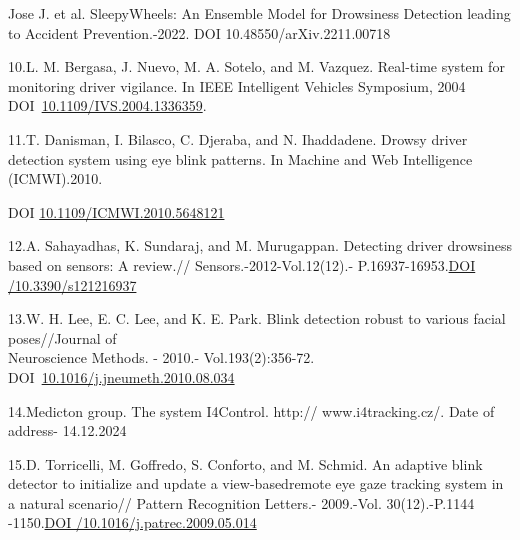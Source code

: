 \begin{references}
Jose J. et al. SleepyWheels: An Ensemble Model for Drowsiness Detection
leading to Accident Prevention.-2022. DOI 10.48550/arXiv.2211.00718

10.L. M. Bergasa, J. Nuevo, M. A. Sotelo, and M. Vazquez. Real-time
system for monitoring driver vigilance. In IEEE Intelligent Vehicles
Symposium, 2004
DOI~\href{https://doi.org/10.1109/IVS.2004.1336359}{10.1109/IVS.2004.1336359}.

11.T. Danisman, I. Bilasco, C. Djeraba, and N. Ihaddadene. Drowsy driver
detection system using eye blink patterns. In Machine and Web
Intelligence (ICMWI).2010.

DOI
\href{http://dx.doi.org/10.1109/ICMWI.2010.5648121}{10.1109/ICMWI.2010.5648121}

12.A. Sahayadhas, K. Sundaraj, and M. Murugappan. Detecting driver
drowsiness based on sensors: A review.// Sensors.-2012-Vol.12(12).-
P.16937-16953.\href{https://doi.org/10.3390/s121216937}{DOI
/10.3390/s121216937}

13.W. H. Lee, E. C. Lee, and K. E. Park. Blink detection robust to
various facial poses//Journal of \\Neuroscience Methods. - 2010.-
Vol.193(2):356-72.
DOI~\href{https://doi.org/10.1016/j.jneumeth.2010.08.034}{10.1016/j.jneumeth.2010.08.034}

14.Medicton group. The system I4Control. http:// www.i4tracking.cz/.
Date of address- 14.12.2024

15.D. Torricelli, M. Goffredo, S. Conforto, and M. Schmid. An adaptive
blink detector to initialize and update a view-basedremote eye gaze
tracking system in a natural scenario// Pattern Recognition Letters.-
2009.-Vol. 30(12).-P.1144
-1150.\href{https://doi.org/10.1016/j.patrec.2009.05.014}{DOI
/10.1016/j.patrec.2009.05.014}
\end{references}

